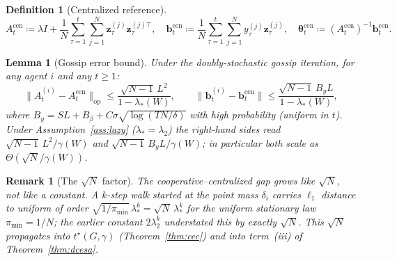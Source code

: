 \documentclass[11pt]{article}
\newtheorem{lemma}[theorem]{Lemma}
\newtheorem{definition}[theorem]{Definition}
\newtheorem*{remark}{Remark}
\begin{document}
\begin{definition}[Centralized reference]\label{def:cen}
\[
A_t^{\mathrm{cen}}\coloneqq\lambda I+\frac{1}{N}\sum_{\tau=1}^t\sum_{j=1}^N
\bm{z}_\tau^{(j)}\bm{z}_\tau^{(j)\top},\quad
\bm{b}_t^{\mathrm{cen}}\coloneqq\frac{1}{N}\sum_{\tau=1}^t\sum_{j=1}^N
y_\tau^{(j)}\bm{z}_\tau^{(j)},\quad
\bm{\theta}_t^{\mathrm{cen}}\coloneqq(A_t^{\mathrm{cen}})^{-1}\bm{b}_t^{\mathrm{cen}}.
\]
\end{definition}

\begin{lemma}[Gossip error bound]\label{lem:gossip}
Under the doubly-stochastic gossip iteration, for any agent $i$ and any $t\geq 1$:
\begin{equation}
\|A_t^{(i)}-A_t^{\mathrm{cen}}\|_{\mathrm{op}}
\leq\frac{\sqrt{N-1}\,L^2}{1-\lambda_*(W)},\qquad
\|\bm{b}_t^{(i)}-\bm{b}_t^{\mathrm{cen}}\|
\leq\frac{\sqrt{N-1}\,B_y L}{1-\lambda_*(W)},
\label{eq:gossip_err}
\end{equation}
where $B_y=SL+B_\beta+C\sigma\sqrt{\log(TN/\delta)}$
with high probability (uniform in $t$).
Under Assumption~\ref{ass:lazy} ($\lambda_*=\lambda_2$) the right-hand
sides read $\sqrt{N-1}\,L^2/\gamma(W)$ and
$\sqrt{N-1}\,B_y L/\gamma(W)$; in particular both scale as
$\Theta(\sqrt{N}/\gamma(W))$.
\end{lemma}

\begin{remark}[The $\sqrt{N}$ factor]\label{rem:sqrtN}
The cooperative--centralized gap grows like $\sqrt{N}$, not like a
constant.  A $k$-step walk started at the point mass $\delta_i$ carries
$\ell_1$ distance to uniform of order
$\sqrt{1/\pi_{\min}}\,\lambda_*^k=\sqrt{N}\,\lambda_*^k$ for the uniform
stationary law $\pi_{\min}=1/N$; the earlier constant $2\lambda_2^k$
understated this by exactly $\sqrt{N}$.  This $\sqrt{N}$ propagates
into $t^\star(G,\gamma)$ (Theorem~\ref{thm:cec}) and into term~(iii) of
Theorem~\ref{thm:dcesa}.
\end{remark}
\end{document}
